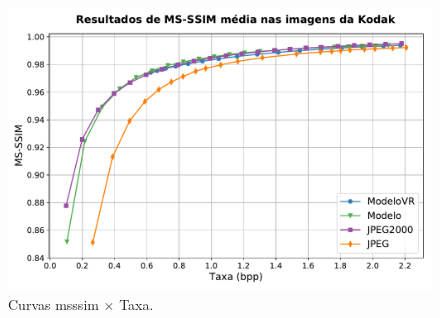 \begin{figure}[H]
	\centering
	\includegraphics[width=1.0\textwidth]{figuras/comp_codecs_msssim.pdf}
	\caption[Comparações de autocodificadores com o \acrshort{jpeg} e \acrshort{jpeg}2000 em \acrshort{msssim}]{Curvas \acrshort{msssim} $\times$ Taxa.}  	
	\label{fig:comp_msssim}
\end{figure}












